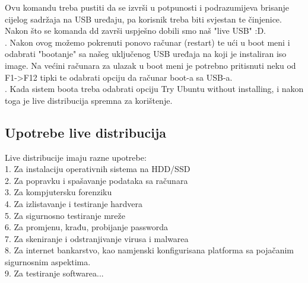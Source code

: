 \documentclass[12pt,vi]{mitthesis}
\begin{document}
\indent
Ovu komandu treba pustiti da se izvrši u potpunosti i podrazumijeva brisanje cijelog sadržaja na USB uređaju, pa korisnik treba biti svjestan te činjenice.\\
\indent
Nakon što se komanda dd završi uspješno dobili smo naš "live USB" :D.\\
. Nakon ovog možemo pokrenuti ponovo računar (restart) te ući u boot meni i odabrati "bootanje" sa našeg uključenog USB uređaja na koji je instaliran iso image. Na većini računara za ulazak u boot meni je potrebno pritisnuti neku od F1->F12 tipki te odabrati opciju da računar boot-a sa USB-a.\\
. Kada sistem boota treba odabrati opciju Try Ubuntu without installing, i nakon toga je live distribucija spremna za korištenje.
\subsection*{Upotrebe live distribucija}
\indent
Live distribucije imaju razne upotrebe:\\
1. Za instalaciju operativnih sistema na HDD/SSD\\
2. Za popravku i spašavanje podataka sa računara\\
3. Za kompjutersku forenziku\\
4. Za izlistavanje i testiranje hardvera\\
5. Za sigurnosno testiranje mreže\\
6. Za promjenu, krađu, probijanje passworda\\
7. Za skeniranje i odstranjivanje virusa i malwarea\\
8. Za internet bankarstvo, kao namjenski konfigurisana platforma sa pojačanim sigurnosnim aspektima.\\
9. Za testiranje softwarea...\\
\end{document}
